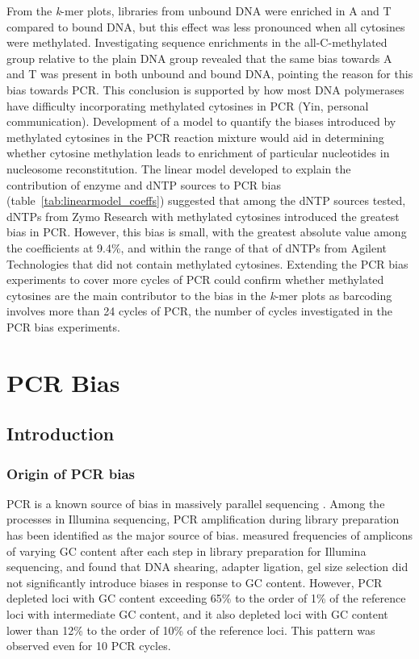 \documentclass[parskip=full, numbers=noenddot]{scrreprt}
\begin{document}
From the \emph{k}-mer plots, libraries from unbound DNA were enriched in A and T compared to bound DNA, but this effect was less pronounced when all cytosines were methylated.  Investigating sequence enrichments in the all-C-methylated group relative to the plain DNA group revealed that the same bias towards A and T was present in both unbound and bound DNA, pointing the reason for this bias towards PCR.  This conclusion is supported by how most DNA polymerases have difficulty incorporating methylated cytosines in PCR (Yin, personal communication). %
Development of a model to quantify the biases introduced by methylated cytosines in the PCR reaction mixture would aid in determining whether cytosine methylation leads to enrichment of particular nucleotides in nucleosome reconstitution.  The linear model developed to explain the contribution of enzyme and dNTP sources to PCR bias (table~\ref{tab:linearmodel_coeffs}) suggested that among the dNTP sources tested, dNTPs from Zymo Research with methylated cytosines introduced the greatest bias in PCR.  However, this bias is small, with the greatest absolute value among the coefficients at 9.4\%, and within the range of that of dNTPs from Agilent Technologies that did not contain methylated cytosines.  Extending the PCR bias experiments to cover more cycles of PCR could confirm whether methylated cytosines are the main contributor to the bias in the \emph{k}-mer plots as barcoding involves more than 24 cycles of PCR, the number of cycles investigated in the PCR bias experiments.

\chapter{PCR Bias}
\label{ch:pcrbias}

\section{Introduction}
\label{sec:pcrbias_intro}

\subsection{Origin of PCR bias}
\label{ssec:pcrbias_intro_origin}

PCR is a known source of bias in massively parallel sequencing \citep{olova_comparison_2018}.  Among the processes in Illumina sequencing, PCR amplification during library preparation has been identified as the major source of bias.
\citet{aird_analyzing_2011} measured frequencies of amplicons of varying GC content after each step in library preparation for Illumina sequencing, and found that DNA shearing, adapter ligation, gel size selection did not significantly introduce biases in response to GC content.  However, PCR depleted loci with GC content exceeding 65\% to the order of 1\% of the reference loci with intermediate GC content, and it also depleted loci with GC content lower than 12\% to the order of 10\% of the reference loci.  This pattern was observed even for 10 PCR cycles.
\end{document}
